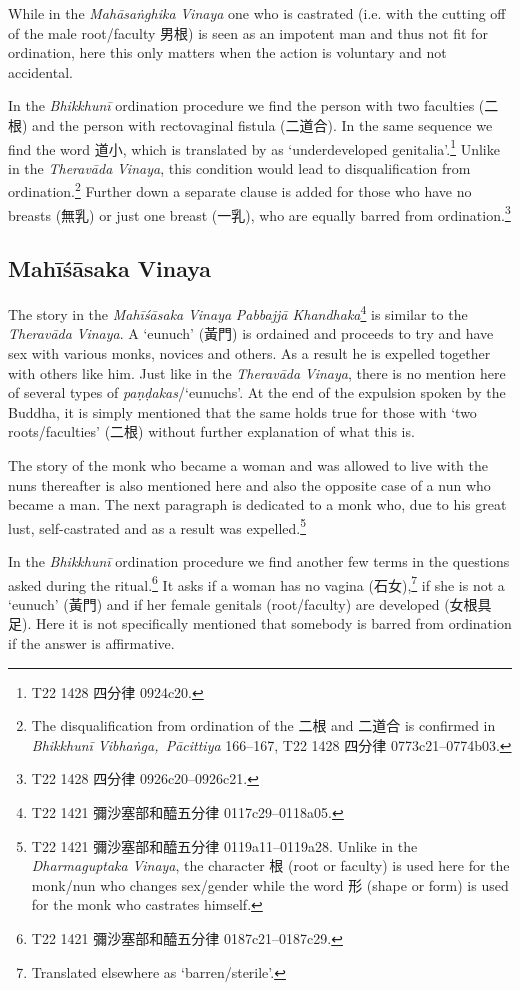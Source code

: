 While in the \textit{Mahāsaṅghika} \textit{Vinaya} one who is castrated (i.e. with the cutting off of the male root/faculty 男根) is seen as an impotent man and thus not fit for ordination, here this only matters when the action is voluntary and not accidental.

In the \textit{Bhikkhunī} ordination procedure we find the person with two faculties (二根) and the person with rectovaginal fistula (二道合). In the same sequence we find the word 道小, which is translated by \cite{bodhi} as `underdeveloped genitalia'.\footnote{T22 1428 四分律 0924c20.} Unlike in the \textit{Theravāda} \textit{Vinaya}, this condition would lead to disqualification from ordination.\footnote{The disqualification from ordination of the 二根 and 二道合 is confirmed in \textit{Bhikkhunī Vibhaṅga, Pācittiya} 166–167, T22 1428 四分律 0773c21–0774b03.} Further down a separate clause is added for those who have no breasts (無乳) or just one breast (一乳), who are equally barred from ordination.\footnote{T22 1428 四分律 0926c20–0926c21.}

\subsection{Mahīśāsaka Vinaya}
The story in the \textit{Mahīśāsaka} \textit{Vinaya} \textit{Pabbajjā Khandhaka}\footnote{T22 1421 彌沙塞部和醯五分律 0117c29–0118a05.} is similar to the \textit{Theravāda} \textit{Vinaya}. A `eunuch' (黃門) is ordained and proceeds to try and have sex with various monks, novices and others. As a result he is expelled together with others like him. Just like in the \textit{Theravāda} \textit{Vinaya}, there is no mention here of several types of \textit{paṇḍakas}/`eunuchs'. At the end of the expulsion spoken by the Buddha, it is simply mentioned that the same holds true for those with `two roots/faculties' (二根) without further explanation of what this is.

The story of the monk who became a woman and was allowed to live with the nuns thereafter is also mentioned here and also the opposite case of a nun who became a man. The next paragraph is dedicated to a monk who, due to his great lust, self-castrated and as a result was expelled.\footnote{T22 1421 彌沙塞部和醯五分律 0119a11–0119a28. Unlike in the \textit{Dharmaguptaka} \textit{Vinaya}, the character 根 (root or faculty) is used here for the monk/nun who changes sex/gender while the word 形 (shape or form) is used for the monk who castrates himself.} 

In the \textit{Bhikkhunī} ordination procedure we find another few terms in the questions asked during the ritual.\footnote{T22 1421 彌沙塞部和醯五分律 0187c21–0187c29.} It asks if a woman has no vagina (石女),\footnote{Translated elsewhere as `barren/sterile'.} if she is not a `eunuch' (黃門) and if her female genitals (root/faculty) are developed (女根具足). Here it is not specifically mentioned that somebody is barred from ordination if the answer is affirmative.


